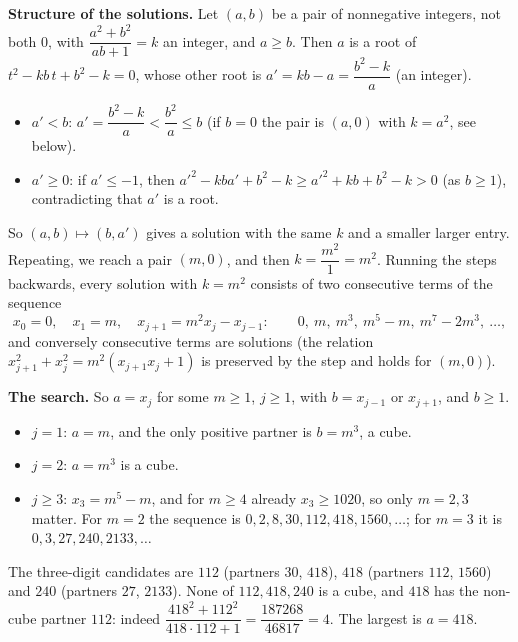 \textbf{Structure of the solutions.} Let $(a,b)$ be a pair of nonnegative integers, not both $0$, with $\dfrac{a^2+b^2}{ab+1}=k$ an integer, and $a\ge b$. Then $a$ is a root of $t^2-kb\,t+b^2-k=0$, whose other root is $a'=kb-a=\dfrac{b^2-k}{a}$ (an integer).
\begin{itemize}
\item $a'<b$: $a'=\dfrac{b^2-k}{a}<\dfrac{b^2}{a}\le b$ (if $b=0$ the pair is $(a,0)$ with $k=a^2$, see below).
\item $a'\ge0$: if $a'\le-1$, then $a'^2-kba'+b^2-k\ge a'^2+kb+b^2-k>0$ (as $b\ge1$), contradicting that $a'$ is a root.
\end{itemize}
So $(a,b)\mapsto(b,a')$ gives a solution with the same $k$ and a smaller larger entry. Repeating, we reach a pair $(m,0)$, and then $k=\dfrac{m^2}{1}=m^2$. Running the steps backwards, every solution with $k=m^2$ consists of two consecutive terms of the sequence
\[
x_0=0,\quad x_1=m,\quad x_{j+1}=m^2x_j-x_{j-1}:\qquad 0,\ m,\ m^3,\ m^5-m,\ m^7-2m^3,\ \dots,
\]
and conversely consecutive terms are solutions (the relation $x_{j+1}^2+x_j^2=m^2(x_{j+1}x_j+1)$ is preserved by the step and holds for $(m,0)$).

\textbf{The search.} So $a=x_j$ for some $m\ge1$, $j\ge1$, with $b=x_{j-1}$ or $x_{j+1}$, and $b\ge1$.
\begin{itemize}
\item $j=1$: $a=m$, and the only positive partner is $b=m^3$, a cube.
\item $j=2$: $a=m^3$ is a cube.
\item $j\ge3$: $x_3=m^5-m$, and for $m\ge4$ already $x_3\ge1020$, so only $m=2,3$ matter. For $m=2$ the sequence is $0,2,8,30,112,418,1560,\dots$; for $m=3$ it is $0,3,27,240,2133,\dots$
\end{itemize}
The three-digit candidates are $112$ (partners $30$, $418$), $418$ (partners $112$, $1560$) and $240$ (partners $27$, $2133$). None of $112,418,240$ is a cube, and $418$ has the non-cube partner $112$: indeed $\dfrac{418^2+112^2}{418\cdot112+1}=\dfrac{187268}{46817}=4$. The largest is $a=\boxed{418}$.
